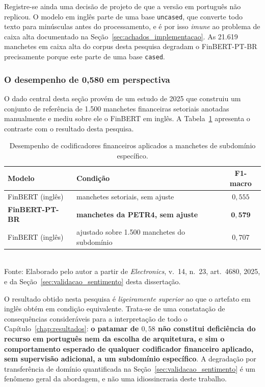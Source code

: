 Registre-se ainda uma decisão de projeto de  que a versão em
português não replicou. O modelo em inglês parte de uma base \texttt{uncased}, que converte todo
texto para minúsculas antes do processamento, e é por isso \emph{imune} ao problema de caixa alta
documentado na Seção~\ref{sec:achados_implementacao}. As 21.619 manchetes em caixa alta do corpus
desta pesquisa degradam o FinBERT-PT-BR precisamente porque este parte de uma base \texttt{cased}.

\subsubsection{O desempenho de 0,580 em perspectiva}

O dado central desta seção provém de um estudo de 2025 que construiu um conjunto de referência de
1.500 manchetes financeiras setoriais anotadas manualmente e mediu sobre ele o FinBERT em inglês.
A Tabela~\ref{tab:contraste_f1} apresenta o contraste com o resultado desta pesquisa.

\begin{table}[htpb]
\centering
\caption{Desempenho de codificadores financeiros aplicados a manchetes de subdomínio específico.}
\label{tab:contraste_f1}
\begin{tabular}{l l c}
\hline
\textbf{Modelo} & \textbf{Condição} & \textbf{F1-macro} \\ \hline
FinBERT (inglês) & manchetes setoriais, sem ajuste & $0{,}555$ \\
\textbf{FinBERT-PT-BR} & \textbf{manchetes da PETR4, sem ajuste} & $\mathbf{0{,}579}$ \\
FinBERT (inglês) & ajustado sobre 1.500 manchetes do subdomínio & $0{,}707$ \\
\hline
\end{tabular}
\vspace{0.2cm}
{\small \\ Fonte: Elaborado pelo autor a partir de \textit{Electronics}, v.~14, n.~23, art.~4680, 2025, e da Seção~\ref{sec:validacao_sentimento} desta dissertação.}
\end{table}

O resultado obtido nesta pesquisa é \emph{ligeiramente superior} ao que o artefato em inglês obtém
em condição equivalente. Trata-se de uma constatação de consequências consideráveis para a
interpretação de todo o Capítulo~\ref{chap:resultados}: \textbf{o patamar de $0{,}58$ não constitui
deficiência do recurso em português nem da escolha de arquitetura, e sim o comportamento esperado de
qualquer codificador financeiro aplicado, sem supervisão adicional, a um subdomínio específico}. A
degradação por transferência de domínio quantificada na Seção~\ref{sec:validacao_sentimento} é um
fenômeno geral da abordagem, e não uma idiossincrasia deste trabalho.

